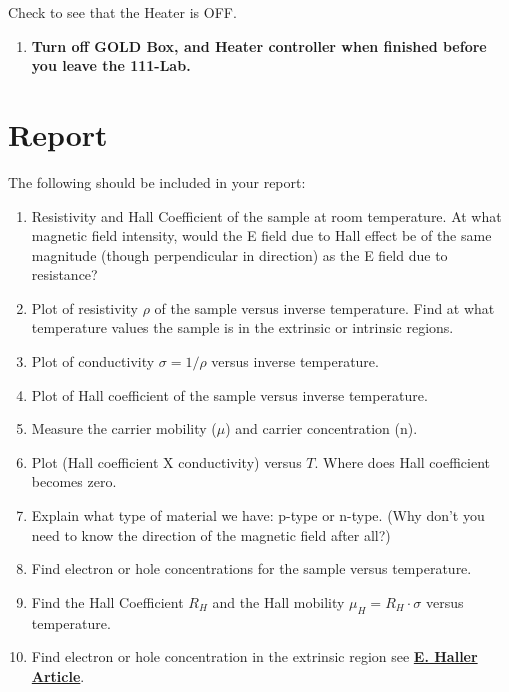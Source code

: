 \documentclass{../lab}
\begin{document}
Check to see that the Heater is OFF.

\begin{enumerate}
    \item \textbf{Turn off GOLD Box, and Heater controller when finished before you leave the 111-Lab.}

\end{enumerate}

\section{Report}

The following should be included in your report:

\begin{enumerate}
    \item Resistivity and Hall Coefficient of the sample at room temperature. At what magnetic field intensity, would the E field due to Hall effect be of the same magnitude (though perpendicular in direction) as the E field due to resistance?

    \item Plot of resistivity $\rho$ of the sample versus inverse temperature. Find at what temperature values the sample is in the extrinsic or intrinsic regions.

    \item Plot of conductivity $\sigma = 1/\rho$ versus inverse temperature.

    \item Plot of Hall coefficient of the sample versus inverse temperature.

    \item Measure the carrier mobility ($\mu$) and carrier concentration (n).

    \item Plot (Hall coefficient X conductivity) versus $T$. Where does Hall coefficient becomes zero.

    \item Explain what type of material we have: p-type or n-type. (Why don't you need to know the direction of the magnetic field after all?)

    \item Find electron or hole concentrations for the sample versus temperature.

    \item Find the Hall Coefficient $ R_H $ and the Hall mobility $\mu_H = R_H \cdot \sigma$ versus temperature.

    \item Find electron or hole concentration in the extrinsic region see \href{http://physics111.lib.berkeley.edu/Physics111/Reprints/SHE/24-Haller.pdf}{\textbf{E. Haller Article}}.


\end{enumerate}
\end{document}

